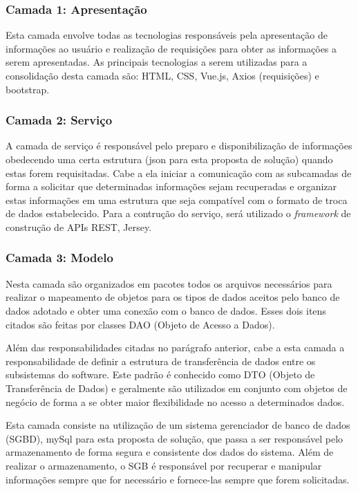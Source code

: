 \pagebreak

\subsubsection{Camada 1: Apresentação}
Esta camada envolve todas as tecnologias responsáveis pela apresentação de informações ao usuário e realização de requisições para obter as informações
a serem apresentadas. As principais tecnologias a serem utilizadas para a consolidação desta camada são: HTML, CSS, Vue.js, Axios (requisições) e bootstrap.

\subsubsection{Camada 2: Serviço}
A camada de serviço é responsável pelo preparo e disponibilização de informações obedecendo uma certa estrutura (json para esta proposta de solução) quando estas forem requisitadas. 
Cabe a ela iniciar a comunicação com as subcamadas de forma a solicitar que determinadas informações sejam recuperadas e organizar estas informações em uma estrutura que seja compatível
com o formato de troca de dados estabelecido. Para a contrução do serviço, será utilizado o \textit{framework} de construção de APIs REST, Jersey.

\subsubsection{Camada 3: Modelo}
Nesta camada são organizados em pacotes todos os arquivos necessários para realizar o mapeamento de objetos para os tipos de dados aceitos pelo banco de dados
adotado e obter uma conexão com o banco de dados. Esses dois itens citados são feitas por classes DAO (Objeto de Acesso a Dados).

Além das responsabilidades citadas no parágrafo anterior, cabe a esta camada a responsabilidade de definir a estrutura de transferência de dados entre os subsistemas
do software. Este padrão é conhecido como DTO (Objeto de Transferência de Dados) e geralmente são utilizados em conjunto com objetos de negócio de forma a se obter maior
flexibilidade no acesso a determinados dados.

Esta camada consiste na utilização de um sistema gerenciador de banco de dados (SGBD), mySql para esta proposta de solução, que passa a ser responsável pelo armazenamento de forma segura e consistente
dos dados do sistema. Além de realizar o armazenamento, o SGB é responsável por recuperar e manipular informações sempre que for necessário e fornece-las sempre que forem solicitadas.

